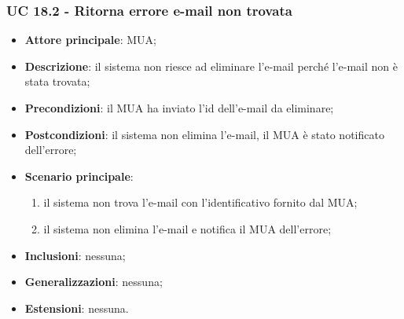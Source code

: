 \subsubsection{UC 18.2 - Ritorna errore e-mail non trovata} \label{sec:UC18.2}
    \begin{itemize}
        \item \textbf{Attore principale}: MUA;
        \item \textbf{Descrizione}: il sistema non riesce ad eliminare l'e-mail perché l'e-mail non è stata trovata;
        \item \textbf{Precondizioni}: il MUA ha inviato l'id dell'e-mail da eliminare;
        \item \textbf{Postcondizioni}: il sistema non elimina l'e-mail, il MUA è stato notificato dell'errore;
        \item \textbf{Scenario principale}:
            \begin{enumerate}
                \item il sistema non trova l'e-mail con l'identificativo fornito dal MUA;
                \item il sistema non elimina l'e-mail e notifica il MUA dell'errore;
            \end{enumerate}
        \item \textbf{Inclusioni}: nessuna;
        \item \textbf{Generalizzazioni}: nessuna;
        \item \textbf{Estensioni}: nessuna.
    \end{itemize}
